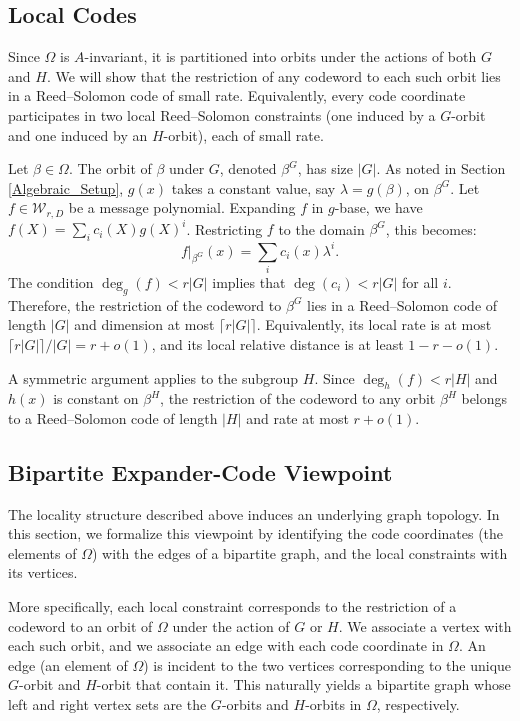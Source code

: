 \documentclass[11pt]{article}
\theoremstyle{plain}
\theoremstyle{definition}
\begin{document}
\subsection{Local Codes}
\label{sec:local-codes}
Since $\Omega$ is $A$-invariant, it is partitioned into orbits under the actions of both $G$ and $H$. We will show that the restriction of any codeword to each such orbit lies in a Reed--Solomon code of small rate. Equivalently, every code coordinate participates in two local Reed--Solomon constraints (one induced by a $G$-orbit and one induced by an $H$-orbit), each of small rate.



Let $\beta \in \Omega$. The orbit of $\beta$ under $G$, denoted $\beta^G$, has size $|G|$. As noted in Section \ref{Algebraic_Setup}, $g(x)$ takes a constant value, say $\lambda=g(\beta)$, on $\beta^G$. 
Let $f \in \mathcal{W}_{r,D}$ be a message polynomial. Expanding $f$ in $g$-base, we have $f(X) = \sum_i c_i(X) g(X)^i$. 
Restricting $f$ to the domain $\beta^G$, this becomes:
\[
    f|_{\beta^G}(x) = \sum_i c_i(x) \lambda^i.
\]
The condition $\deg_g(f) < r|G|$ implies that $\deg(c_i) < r|G|$ for all $i$. Therefore, the restriction of the codeword to $\beta^G$ lies in a Reed--Solomon code
of length $|G|$ and dimension at most $\lceil r|G|\rceil$. Equivalently, its local rate
is at most $\lceil r|G|\rceil/|G|=r+o(1)$, and its local relative distance is at least $1-r-o(1)$.

A symmetric argument applies to the subgroup $H$. Since $\deg_h(f) < r|H|$ and $h(x)$ is constant on $\beta^H$, the restriction of the codeword to any orbit $\beta^H$ belongs to a Reed--Solomon code of length $|H|$ and rate at most $r+o(1)$.


\subsection{Bipartite Expander-Code Viewpoint}
\label{subsec:expander-view}

The locality structure described above induces an underlying graph topology. In this section, we formalize this viewpoint by identifying the code coordinates (the elements of $\Omega$) with the edges of a bipartite graph, and the local constraints with its vertices.

More specifically, each local constraint corresponds to the restriction of a codeword to an orbit of $\Omega$ under the action of $G$ or $H$. We associate a vertex with each such orbit, and we associate an edge with each code coordinate in $\Omega$. An edge (an element of  $\Omega$) is incident to the two vertices corresponding to the unique $G$-orbit and $H$-orbit that contain it. This naturally yields a bipartite graph whose left and right vertex sets are the $G$-orbits and $H$-orbits in $\Omega$, respectively.
\end{document}
